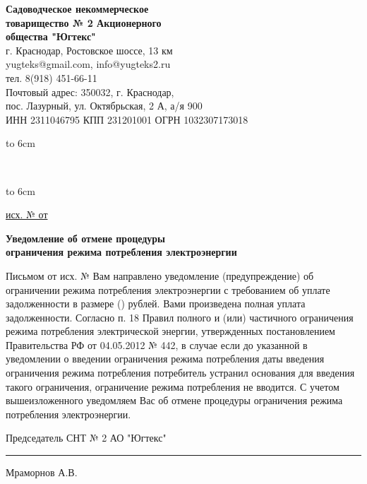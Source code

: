 \noindent\parbox[l][71mm]{80mm}
{
	 \begin{center}
 { \textbf{Садоводческое некоммерческое\\ товарищество
 	№  2 Акционерного\\ общества "Югтекс"\\
 }}
 \footnotesize{г. Краснодар, Ростовское шоссе, 13 км\\
 	yugteks@gmail.com, info@yugteks2.ru\\
 	тел. 8(918) 451-66-11\\
 	Почтовый адрес: 350032, г. Краснодар,\\ пос. Лазурный, ул. Октябрьская, 2 А, а/я   900
  }\\
 {ИНН 2311046795 КПП 231201001 ОГРН 1032307173018}
		\end{center}
\hbox to 6cm{ }}\hfill
\parbox[l][71mm]{65mm}
{ \begin{center}
{
	\textbf{}\\
	\vspace{3mm}
 {\footnotesize {} }

	}
\end{center}
\hbox to 6cm{ }}
\linebreak
\vspace{-12mm}

\underline{исх. №  от } 

\vspace{5mm}
\begin{center}
	\Large\textbf{Уведомление об отмене процедуры\\
		ограничения режима потребления электроэнергии}
\end{center}
\par
\vspace{5mm}


Письмом от          исх. №     Вам    направлено уведомление (предупреждение) об  ограничении режима потребления электроэнергии с требованием об уплате задолженности в размере     ()       рублей.
  Вами произведена полная уплата задолженности.
Согласно п. 18 Правил полного и (или) частичного ограничения режима потребления электрической энергии, утвержденных постановлением Правительства РФ от 04.05.2012 № 442, в случае если до указанной в уведомлении о введении ограничения режима потребления даты введения ограничения режима потребления потребитель устранил основания для введения такого ограничения, ограничение режима потребления не вводится.
С учетом вышеизложенного уведомляем Вас об отмене процедуры ограничения режима потребления электроэнергии. 

\vspace{5mm}



\vspace{15mm}
\noindent Председатель СНТ № 2 АО "Югтекс" \hfill    \rule{3cm}{0.1 mm}    Мраморнов А.В.

\pagebreak

